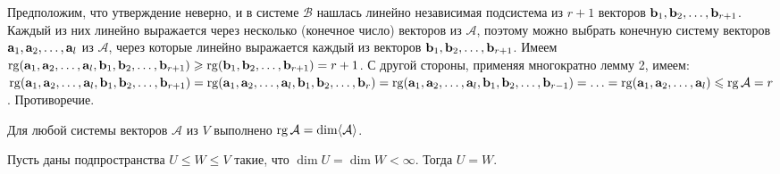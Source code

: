 \dokleft Предположим, что утверждение неверно, и в системе $\mathcal{B}$ нашлась
линейно независимая подсистема из $r+1$  векторов $\vek{b}_1, \vek{b}_2, \hm\ldots, \vek{b}_{r+1}$.
Каждый из них линейно выражается через несколько (конечное число) векторов из
$\mathcal{A}$, поэтому   можно выбрать конечную
систему векторов $\vek{a}_1, \vek{a}_2, \hm\ldots , \vek{a}_l$ из $\mathcal{A}$,
через которые линейно выражается каждый из векторов
$\vek{b}_1, \vek{b}_2, \hm\ldots, \vek{b}_{r+1}$.
Имеем $\rg (\vek{a}_1, \vek{a}_2, \hm\ldots , \vek{a}_l, \vek{b}_1, \vek{b}_2, \hm\ldots, \vek{b}_{r+1}) \hm\geq
\rg (\vek{b}_1, \vek{b}_2, \hm\ldots, \vek{b}_{r+1}) \hm= r\hm+ 1$.
С другой стороны, применяя многократно лемму 2, имеем:
$\rg (\vek{a}_1, \vek{a}_2, \hm\ldots , \vek{a}_l, \vek{b}_1, \vek{b}_2, \hm\ldots, \vek{b}_{r+1}) \hm=
\rg (\vek{a}_1, \vek{a}_2, \hm\ldots , \vek{a}_l, \vek{b}_1, \vek{b}_2, \hm\ldots, \vek{b}_{r}) \hm=
\rg (\vek{a}_1, \vek{a}_2, \hm\ldots , \vek{a}_l, \vek{b}_1, \vek{b}_2, \hm\ldots, \vek{b}_{r-1}) \hm= \hm\ldots \hm=
\rg (\vek{a}_1, \vek{a}_2, \hm\ldots , \vek{a}_l) \hm\leq \rg \mathcal{A} \hm= r$. Противоречие.
\edok




\begin{sled1}
Для любой системы векторов $\mathcal{A} $ из $V$
выполнено $\mathop{\rm rg}\nolimits \mathcal{A} = \mathop{\rm dim}\nolimits \langle \mathcal{A} \rangle$.
\end{sled1}

\begin{sled2}
Пусть даны подпространства $U\leq W\leq V$ такие, что $\dim U = \dim W <\infty $. Тогда $U=W$.
\end{sled2}





